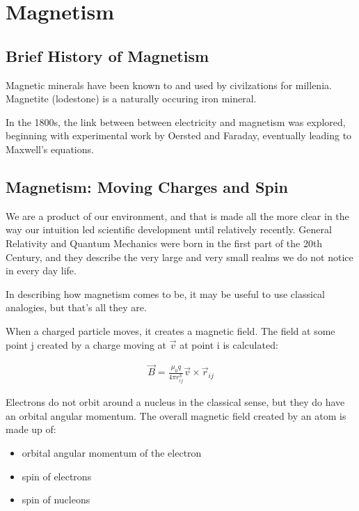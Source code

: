 \section{Magnetism}


\subsection{Brief History of Magnetism}

Magnetic minerals have been known to and used by civilzations for millenia.  Magnetite (lodestone) is a naturally occuring iron mineral.

In the 1800s, the link between between electricity and magnetism was explored, beginning with experimental work by Oersted and Faraday, eventually leading to Maxwell's equations.



\subsection{Magnetism: Moving Charges and Spin}

We are a product of our environment, and that is made all the more clear in the way our intuition led scientific development until relatively recently.  General Relativity and Quantum Mechanics were born in the first part of the 20th Century, and they describe the very large and very small realms we do not notice in every day life.

In describing how magnetism comes to be, it may be useful to use classical analogies, but that's all they are.

When a charged particle moves, it creates a magnetic field.  The field at some point j created by a charge moving at $\vec{v}$ at point i is calculated:

\begin{equation}
\begin{split}
\vec{B} = \frac{\mu_0 q}{4 \pi r_{ij}^3} \vec{v} \times \vec{r}_{ij}
\end{split}
\label{eq:eqSplineThreeEquations}
\end{equation}

Electrons do not orbit around a nucleus in the classical sense, but they do have an orbital angular momentum.  The overall magnetic field created by an atom is made up of:

\begin{itemize}
  \item orbital angular momentum of the electron
  \item spin of electrons
  \item spin of nucleons 
\end{itemize}

